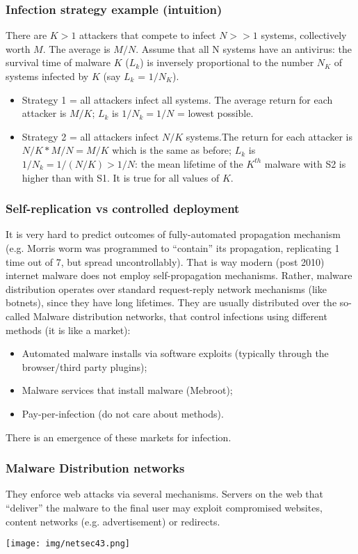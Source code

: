 \documentclass[a4paper, 10pt, titlepage]{article}
\begin{document}
\subsubsection*{Infection strategy example (intuition)}
There are $K>1$ attackers that compete to infect $N>>1$ systems, collectively worth $M$. The average is $M/N$. Assume that all N systems have an antivirus: the survival time of malware $K$ ($L_k$) is inversely proportional to the number $N_K$ of systems infected by $K$ (say $L_k$ = $1/N_K$).
\begin{itemize}
	\item Strategy 1 = all attackers infect all systems. The average return for each attacker is $M/K$; $L_k$ is $1/N_k =1/N$ = lowest possible.
	\item Strategy 2 = all attackers infect $N/K$ systems.The return for each attacker is $N/K*M/N=M/K$ which is the same as before; $L_k$ is $1/N_k = 1/(N/K) > 1/N$: the mean lifetime of the $K^{th}$ malware with S2 is higher than with S1. It is true for all values of $K$.
\end{itemize}

\subsubsection*{Self-replication vs controlled deployment}
It is very hard to predict outcomes of fully-automated propagation mechanism (e.g. Morris worm was programmed to “contain” its propagation, replicating 1 time out of 7, but spread uncontrollably). That is way modern (post 2010) internet malware does not employ self-propagation mechanisms. Rather, malware distribution operates over standard request-reply network mechanisms (like botnets), since they have long lifetimes. They are usually distributed over the so-called Malware distribution networks, that control infections using different methods (it is like a market):
\begin{itemize}
	\item Automated malware installs via software exploits (typically through the browser/third party plugins);
	\item Malware services that install malware (Mebroot);
	\item Pay-per-infection (do not care about methods).
\end{itemize}
There is an emergence of these markets for infection.

\subsubsection*{Malware Distribution networks}
They enforce web attacks via several mechanisms. Servers on the web that “deliver” the malware to the final user may exploit compromised websites, content networks (e.g. advertisement) or redirects.
\begin{center}
	\texttt{[image: img/netsec43.png]}
\end{center}
\end{document}
